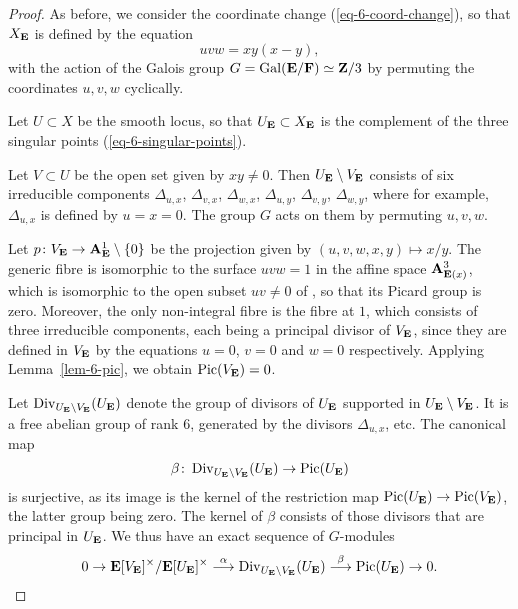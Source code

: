 \begin{proof}
    As before, we consider the coordinate change (\ref{eq-6-coord-change}),
    so that $X_{\bbE}$ is defined by the equation
    \[ u v w = x y (x - y), \]
    with the action of the Galois group $G = \operatorname{Gal} (\bbE/\bbF) \simeq \bbZ / 3$
    by permuting the coordinates $u, v, w$ cyclically.

    Let $U \subset X$ be the smooth locus, so that
    $U_{\bbE} \subset X_{\bbE}$ is the complement of the three singular points (\ref{eq-6-singular-points}).

    Let $V \subset U$ be the open set given by $xy \neq 0$.
    Then $U_{\bbE} \setminus V_{\bbE}$ consists of six irreducible components
    $\Delta_{u,x}$, $\Delta_{v,x}$, $\Delta_{w,x}$, $\Delta_{u,y}$, $\Delta_{v,y}$, $\Delta_{w,y}$, 
    where for example, $\Delta_{u,x}$ is defined by $u = x = 0$.
    The group $G$ acts on them by permuting $u,v,w$.

    Let $p \: V_{\bbE} \to \bbA_{\bbE}^1 \setminus \{0\}$ be the projection given by $(u,v,w,x,y) \mapsto x/y$.
    The generic fibre is isomorphic to the surface $uvw = 1$ in the affine space $\bbA_{\bbE(x)}^3$,
    which is isomorphic to the open subset $uv \neq 0$ of ,
    so that its Picard group is zero.
    Moreover, the only non-integral fibre is the fibre at $1$,
    which consists of three irreducible components, each being a principal divisor of $V_{\bbE}$,
    since they are defined in $V_{\bbE}$ by the equations $u=0$, $v=0$ and $w=0$ respectively.
    Applying Lemma~\ref{lem-6-pic}, we obtain $\operatorname{Pic}(V_{\bbE}) = 0$.

    Let $\operatorname{Div}_{U_{\bbE} \setminus V_{\bbE}} (U_{\bbE})$
    denote the group of divisors of $U_{\bbE}$ supported in $U_{\bbE} \setminus V_{\bbE}$.
    It is a free abelian group of rank $6$, generated by the divisors $\Delta_{u,x}$, etc.
    The canonical map 
    \[ \beta \: \operatorname{Div}_{U_{\bbE} \setminus V_{\bbE}} (U_{\bbE}) \to \operatorname{Pic} (U_{\bbE}) \]
    is surjective, as its image is the kernel of the restriction map 
    $\operatorname{Pic} (U_{\bbE}) \to \operatorname{Pic} (V_{\bbE})$, the latter group being zero.
    The kernel of $\beta$ consists of those divisors that are principal in $U_{\bbE}$.
    We thus have an exact sequence of $G$-modules
    \begin{equation} \label{eq-6-exact-g-modules-1}
        0   \to \bbE[V_{\bbE}]^\times / \bbE[U_{\bbE}]^\times 
            \overset{\alpha}{\longrightarrow} \operatorname{Div}_{U_{\bbE} \setminus V_{\bbE}} (U_{\bbE}) 
            \overset{\beta}{\longrightarrow}  \operatorname{Pic} (U_{\bbE}) \to 0.
    \end{equation}


\end{proof}
